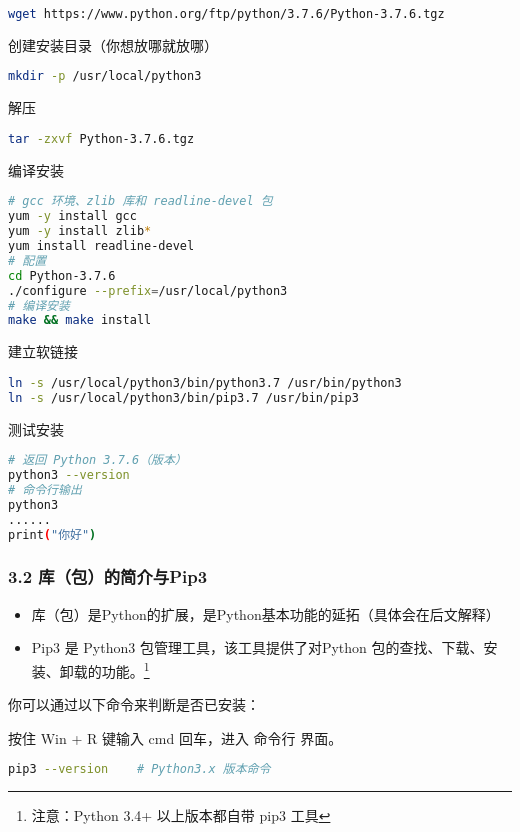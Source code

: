 \begin{lstlisting}[language=bash]
wget https://www.python.org/ftp/python/3.7.6/Python-3.7.6.tgz
\end{lstlisting}

创建安装目录（你想放哪就放哪）
\begin{lstlisting}[language=bash]
mkdir -p /usr/local/python3
\end{lstlisting}

解压
\begin{lstlisting}[language=bash]
tar -zxvf Python-3.7.6.tgz
\end{lstlisting}

编译安装
\begin{lstlisting}[language=bash]
# gcc 环境、zlib 库和 readline-devel 包
yum -y install gcc
yum -y install zlib*
yum install readline-devel
# 配置
cd Python-3.7.6
./configure --prefix=/usr/local/python3
# 编译安装
make && make install
\end{lstlisting}

建立软链接
\begin{lstlisting}[language=bash]
ln -s /usr/local/python3/bin/python3.7 /usr/bin/python3
ln -s /usr/local/python3/bin/pip3.7 /usr/bin/pip3
\end{lstlisting}

测试安装
\begin{lstlisting}[language=bash]
# 返回 Python 3.7.6（版本）
python3 --version
# 命令行输出
python3
......
print("你好")
\end{lstlisting}

\subsubsection{3.2 库（包）的简介与Pip3}

\begin{itemize}
\item 库（包）是Python的扩展，是Python基本功能的延拓（具体会在后文解释）
\item Pip3 是 Python3 包管理工具，该工具提供了对Python 包的查找、下载、安装、卸载的功能。\footnote{注意：Python 3.4+ 以上版本都自带 pip3 工具}
\end{itemize}

你可以通过以下命令来判断是否已安装：

按住 Win + R 键输入 cmd 回车，进入 命令行 界面。


\begin{lstlisting}[language=bash]
pip3 --version    # Python3.x 版本命令
\end{lstlisting}

